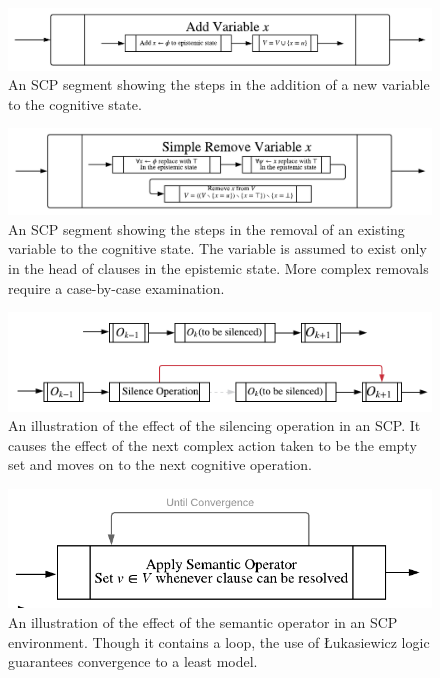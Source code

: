 \documentclass{article}
\begin{document}
\begin{figure}
 \centering \includegraphics[scale=0.75]{addVariableSCP}
\caption{An SCP segment showing the steps in the addition of a new variable to the cognitive state.}
\label {fig:addVariable}
\end{figure}

\begin{figure}
 \centering \includegraphics[scale=0.75]{removeVariableSCP}
\caption{An SCP segment showing the steps in the removal of an existing variable to the cognitive state. The variable is assumed to exist only in the head of clauses in the epistemic state. More complex removals require a case-by-case examination.}
\label {fig:removeVariable}
\end{figure}

\begin{figure}
 \centering \includegraphics[scale=0.75]{silenceSCP}
\caption{An illustration of the effect of the silencing operation in an SCP. It causes the effect of the next complex action taken to be the empty set and moves on to the next cognitive operation.}
\label {fig:silence}
\end{figure}

\begin{figure}
 \centering \includegraphics[scale=0.75]{semanticOperatorSCP}
\caption{An illustration of the effect of the semantic operator in an SCP environment. Though it contains a loop, the use of \L ukasiewicz logic guarantees convergence to a least model. }
\label {fig:semantic}
\end{figure}
\end{document}
